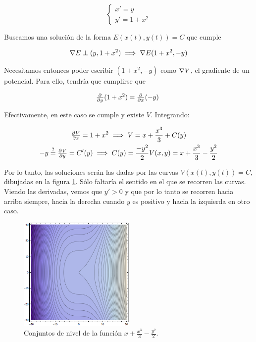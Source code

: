 \begin{example}
\[\begin{cases}x' = y \\ y' = 1+x^2 \end{cases} \]

Buscamos una solución de la forma $E(x(t), y(t)) = C$ que cumple 

\[ \nabla E \perp (y, 1+x^2) \implies \nabla E (1+x^2,-y) \]

Necesitamos entonces poder escribir $(1+x^2,-y)$ como $\nabla V$, el gradiente de un potencial. Para ello, tendría que cumplirse que 

\[ \pd{}{y}(1+x^2) = \pd{}{x}(-y) \]

Efectivamente, en este caso se cumple y existe $V$. Integrando:

\begin{gather*}
\pd{V}{x} = 1+x^2 \implies V = x + \frac{x^3}{3} + C(y) \\
-y \stackrel{?}{=} \pd{V}{y} = C'(y) \implies C(y) = \frac{-y^2}{2}
V(x,y) = x + \frac{x^3}{3} -\frac{y^2}{2}
\end{gather*}

Por lo tanto, las soluciones serán las dadas por las curvas $V(x(t), y(t)) = C$, dibujadas en la figura \ref{imgGranos}. Sólo faltaría el sentido en el que se recorren las curvas. Viendo las derivadas, vemos que $y'>0$ y que por lo tanto se recorren hacia arriba siempre, hacia la derecha cuando $y$ es positivo y hacia la izquierda en otro caso.

\end{example}

\begin{figure}
\centering
\includegraphics[width=0.5\textwidth]{img/Grano.png}
\caption{Conjuntos de nivel de la función $x + \frac{x^3}{3} -\frac{y^2}{2}$.}
\label{imgGranos}
\end{figure}

